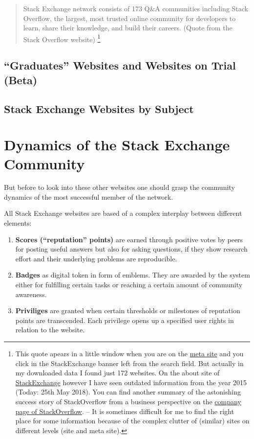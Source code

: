 \documentclass[]{book}
\providecommand{\tightlist}{%
  \setlength{\itemsep}{0pt}\setlength{\parskip}{0pt}}
\let\rmarkdownfootnote\footnote%
\def\footnote{\protect\rmarkdownfootnote}
\theoremstyle{definition}
\theoremstyle{definition}
\theoremstyle{definition}
\theoremstyle{remark}
\begin{document}
\begin{quote}
Stack Exchange network consists of 173 Q\&A communities including Stack
Overflow, the largest, most trusted online community for developers to
learn, share their knowledge, and build their careers. (Quote from the
Stack Overflow website) \footnote{This quote apears in a little window
  when you are on the \href{https://meta.stackexchange.com}{meta site}
  and you click in the StackExchange banner left from the search field.
  But actually in my downloaded data I found just 172 websites. On the
  about site of \href{https://stackexchange.com/about}{StackExchange}
  however I have seen outdated information from the year 2015 (Today:
  25th May 2018). You can find another summary of the astonishing
  success story of StackOverflow from a business perspective on the
  \href{https://stackoverflow.com/company}{company page of
  StackOverflow}. -- It is sometimes difficult for me to find the right
  place for some information because of the complex clutter of (similar)
  sites on different levels (site and meta site).}
\end{quote}

\subsection{\texorpdfstring{``Graduates'' Websites and Websites on Trial
(Beta)}{Graduates Websites and Websites on Trial (Beta)}}\label{graduates-websites-and-websites-on-trial-beta}

\subsection{Stack Exchange Websites by
Subject}\label{stack-exchange-websites-by-subject}

\section{Dynamics of the Stack Exchange
Community}\label{dynamics-of-the-stack-exchange-community}

But before to look into these other websites one should grasp the
community dynamics of the most successful member of the network.

All Stack Exchange websites are based of a complex interplay between
different elements:

\begin{enumerate}
\def\labelenumi{\arabic{enumi}.}
\tightlist
\item
  \textbf{Scores (``reputation'' points)} are earned through positive
  votes by peers for posting useful answers but also for asking
  questions, if they show research effort and their underlying problems
  are reproducible.
\item
  \textbf{Badges} as digital token in form of emblems. They are awarded
  by the system either for fulfilling certain tasks or reaching a
  certain amount of community awareness.
\item
  \textbf{Priviliges} are granted when certain thresholds or milestones
  of reputation points are transcended. Each privilege opens up a
  specified user rights in relation to the website.
\end{enumerate}
\end{document}
